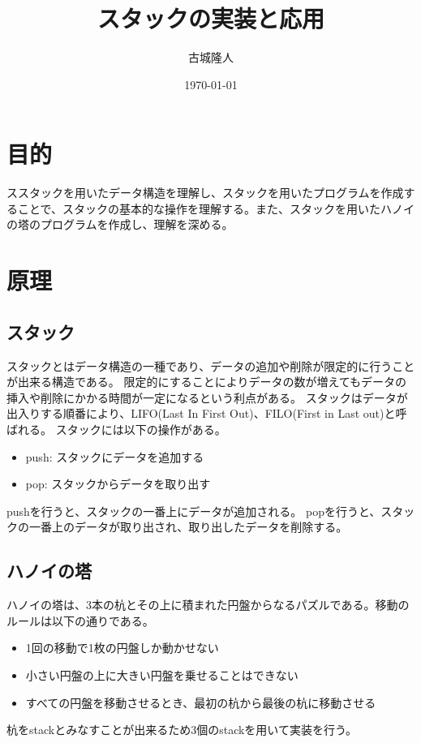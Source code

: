 \documentclass[a4paper,11pt]{jsarticle}
\begin{document}
\title{スタックの実装と応用}
\author{古城隆人}
\date{\today}
\maketitle

\tableofcontents

\newpage


\section{目的}
ススタックを用いたデータ構造を理解し、スタックを用いたプログラムを作成することで、スタックの基本的な操作を理解する。また、スタックを用いたハノイの塔のプログラムを作成し、理解を深める。
\section{原理}
\subsection{スタック}
スタックとはデータ構造の一種であり、データの追加や削除が限定的に行うことが出来る構造である。
限定的にすることによりデータの数が増えてもデータの挿入や削除にかかる時間が一定になるという利点がある。
スタックはデータが出入りする順番により、LIFO(Last In First Out)、FILO(First in Last out)と呼ばれる。
スタックには以下の操作がある。
\begin{itemize}
  \item push: スタックにデータを追加する
  \item pop: スタックからデータを取り出す
\end{itemize}
pushを行うと、スタックの一番上にデータが追加される。
popを行うと、スタックの一番上のデータが取り出され、取り出したデータを削除する。
\subsection{ハノイの塔}\label{sec:mysection}
ハノイの塔は、3本の杭とその上に積まれた円盤からなるパズルである。移動のルールは以下の通りである。
\begin{itemize}
  \item 1回の移動で1枚の円盤しか動かせない
  \item 小さい円盤の上に大きい円盤を乗せることはできない
  \item すべての円盤を移動させるとき、最初の杭から最後の杭に移動させる
\end{itemize}
杭をstackとみなすことが出来るため3個のstackを用いて実装を行う。
\end{document}
